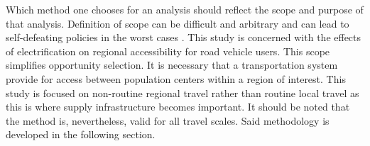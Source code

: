Which method one chooses for an analysis should reflect the scope and purpose of that analysis. Definition of scope can be difficult and arbitrary and can lead to self-defeating policies in the worst cases \cite{Handy_1996}. This study is concerned with the effects of electrification on regional accessibility for road vehicle users. This scope simplifies opportunity selection. It is necessary that a transportation system provide for access between population centers within a region of interest. This study is focused on non-routine regional travel rather than routine local travel as this is where supply infrastructure becomes important. It should be noted that the method is, nevertheless, valid for all travel scales. Said methodology is developed in the following section.